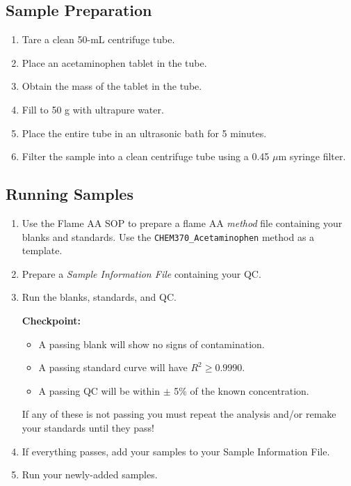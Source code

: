\documentclass[]{tufte-book}
\providecommand{\tightlist}{%
  \setlength{\itemsep}{0pt}\setlength{\parskip}{0pt}}
\begin{document}
\hypertarget{sample-preparation-3}{%
\subsection{Sample Preparation}\label{sample-preparation-3}}

\begin{enumerate}
\def\labelenumi{\arabic{enumi}.}
\tightlist
\item
  Tare a clean 50-mL centrifuge tube.
\item
  Place an acetaminophen tablet in the tube.
\item
  Obtain the mass of the tablet in the tube.
\item
  Fill to 50 g with ultrapure water.
\item
  Place the entire tube in an ultrasonic bath for 5 minutes.
\item
  Filter the sample into a clean centrifuge tube using a 0.45 \(\mu\)m syringe filter.
\end{enumerate}

\hypertarget{running-samples-1}{%
\subsection{Running Samples}\label{running-samples-1}}

\begin{enumerate}
\def\labelenumi{\arabic{enumi}.}
\tightlist
\item
  Use the Flame AA SOP to prepare a flame AA \emph{method} file containing your blanks and standards. Use the \texttt{CHEM370\_Acetaminophen} method as a template.
\item
  Prepare a \emph{Sample Information File} containing your QC.
\item
  Run the blanks, standards, and QC.

  \begin{marginfigure}
   \textbf{Checkpoint:}

   \begin{itemize}
   \tightlist
   \item
     A passing blank will show no signs of contamination.\\
   \item
     A passing standard curve will have \(R^2 \ge 0.9990\).\\
   \item
     A passing QC will be within \(\pm\) 5\% of the known concentration.
   \end{itemize}

   If any of these is not passing you must repeat the analysis and/or
   remake your standards until they pass!
   \end{marginfigure}
\item
  If everything passes, add your samples to your Sample Information File.
\item
  Run your newly-added samples.
\end{enumerate}
\end{document}

